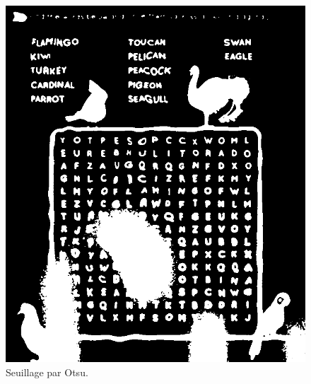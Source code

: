 \documentclass{article}
\begin{document}
\begin{itemize}
\begin{figure}[H]
        \includegraphics[width=\linewidth]{ressources/image_3_word_detection_03_otsu_threshold.png}
        \caption{}
      \endminipage
      \caption{Seuillage par Otsu.}
    \end{figure}


\end{itemize}
\end{document}
